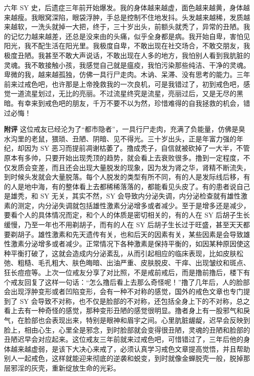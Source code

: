 \begin{case}
    六年 SY 史，后遗症三年前开始爆发。我的身体越来越虚，面色越来越黄，身体越来越瘦。我眼窝深陷，眼袋浮肿，手总是控制不住地发抖。头发越来越稀，发质越来越软，一洗头就掉一大把，终于，三十岁出头，前额头就秃了，异常的丑陋。我的记忆力越来越差，还总是没来由的头痛，似乎全身都是病。我开始自卑，害怕见阳光，我不配生活在阳光里。我极度自卑，不敢出现在社交场合，不敢交朋友，我极度丑陋。我甚至不敢大声说话，不敢出现在人多的地方，我怕别人看到我肮脏的灵魂。我不敢接触小孩，我感觉自己就是瘟疫，我怕污染那些纯洁、干净的灵魂。卑微的我，越来越孤独，仿佛一具行尸走肉。木讷、呆滞、没有思考的能力。三年前来过戒色吧，也许那是上帝挽救我的一次良机，可是我错过了，初到戒色吧，感觉一道流星划过，无比的亮丽。不过流星终究是流星，亮丽过后，又是无尽的黑暗。有幸来到戒色吧的朋友，千万不要不以为然，珍惜难得的自我拯救的机会，错过必悔！

    \textbf{附评} 这位戒友已经沦为了“都市隐者”，一具行尸走肉，充满了负能量，仿佛是臭水沟里的老鼠，猥琐、丑陋、阴暗、见不得光。三十岁出头，正是年富力强的年纪，却因为 SY 恶习而提前凋谢枯萎了。撸成秃子，自信就被砍掉了一大半，不管原本有多帅，只要开始出现秃顶的趋势，就会看上去衰败很多。撸到一定程度，不仅发质会变差，而且还会出现大量脱发的现象，因为发为肾之华，肾精不断流失，到时候头发就会大量脱落。每个人脱发的类型有所不同，有的人是发际线后移，有的人是地中海，有的整体看上去都稀稀落落的，都能看见头皮了。有的患者说自己是雄秃，和 SY 无关，其实不然，SY 会导致内分泌失调，内分泌检查就有雄性激素的测定，内分泌失调就包括雄性激素分泌增多或者减少。至于是增多还是减少，要看个人的具体情况而定，和个人的体质是密切相关的，有的人在 SY 后胡子生长缓慢，乃至一年也不用剃胡子，而有的人在 SY 后胡子生长过于旺盛，甚至天天都要剃胡子。雄性激素和先天遗传有关，也和后天的因素有关，某些因素是会导致雄性激素分泌增多或者减少。正常情况下各种激素是保持平衡的，如因某种原因使这种平衡打破了，这就会造成内分泌紊乱，从而引起相应的临床表现，比如皮肤松弛、粗糙、毛孔粗大、肤色晦暗、出油严重、皮肤脱皮、干痒、出现皱纹和斑点、狂长痘痘等。上次一位戒友分享了对比照，不是戒前戒后，而是撸前撸后，楼下有个戒友回复了这样一句话：“怎么撸后看上去那么奇怪呢！”撸了几年后，人的脸部会出现浮肿变形或者凹陷变形，会有一种不对称的感觉，国外的戒色文章也专门提到了 SY 会导致不对称，也不仅是脸部的不对称，还包括全身上下的不对称，总之看上去有一种奇怪的感觉，那种变形丑陋的感觉很明显。撸者身上有一股邪气和戾气，在脸部也会表现出来，特别是眼神和眉宇之间。心里肮脏龌龊，迟早会反映到脸上，相由心生，心里全是邪念，到时脸部就会变得很丑陋，灵魂的丑陋和脸部的丑陋迟早会对应起来。这位戒友三年前就来过戒色吧，可惜错过了，三年后他的身体越来越虚弱，是该下大决心来戒了，必须认真学习戒色文章提高觉悟，并且帮助别人一起戒色，这样就能迎来彻底的逆袭和蜕变，到时就像金蝉脱壳一般，脱掉那层邪淫的灰壳，重新绽放生命的光彩。
\end{case}

